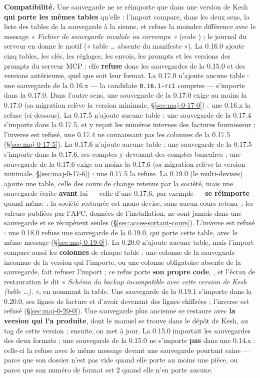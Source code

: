 \documentclass[a4paper,11pt,oneside]{article}
\begin{document}
\textbf{Compatibilité.} Une sauvegarde ne se réimporte que dans une version de Kesh \textbf{qui porte les mêmes tables} qu'elle : l'import compare, dans les deux sens, la liste des tables de la sauvegarde à la sienne, et refuse la moindre différence avec le message \emph{« Fichier de sauvegarde invalide ou corrompu »} (code ) ; le journal du serveur en donne le motif (« table \ldots{} absente du manifeste »). La 0.16.0 ajoute cinq tables, les clés, les réglages, les envois, les prompts et les versions des prompts du serveur MCP : elle \textbf{refuse} donc les sauvegardes de la 0.15.0 et des versions antérieures, quel que soit leur format. La 0.17.0 n'ajoute aucune table : une sauvegarde de la 0.16.x --- la candidate \texttt{0.16.1-rc1} comprise --- s'importe dans la 0.17.0. Dans l'autre sens, une sauvegarde de la 0.17.0 exige au moins la 0.17.0 (sa migration relève la version minimale, \S\ref{sec:maj-0-17-0}) : une 0.16.x la refuse (ci-dessous). La 0.17.5 n'ajoute aucune table : une sauvegarde de la 0.17.4 s'importe dans la 0.17.5, et y reçoit les numéros internes des factures fournisseur ; l'inverse est refusé, une 0.17.4 ne connaissant pas les colonnes de la 0.17.5 (\S\ref{sec:maj-0-17-5}). La 0.17.6 n'ajoute aucune table : une sauvegarde de la 0.17.5 s'importe dans la 0.17.6, ses comptes y devenant des comptes bancaires ; une sauvegarde de la 0.17.6 exige au moins la 0.17.6 (sa migration relève la version minimale, \S\ref{sec:maj-0-17-6}) : une 0.17.5 la refuse. La 0.19.0 (le multi-devises) ajoute une table, celle des cours de change retenus par la société, mais une sauvegarde écrite \textbf{avant} lui --- celle d'une 0.17.6, par exemple --- \textbf{se réimporte} quand même~: la société restaurée est mono-devise, sans aucun cours retenu~; les valeurs publiées par l'AFC, données de l'installation, ne sont jamais dans une sauvegarde et se récupèrent seules (\S\ref{sec:acces-sortant-cours}). L'inverse est refusé : une 0.18.0 refuse une sauvegarde de la 0.19.0, qui porte cette table, avec le même message (\S\ref{sec:maj-0-19-0}). La 0.20.0 n'ajoute aucune table, mais l'import compare aussi les \textbf{colonnes} de chaque table : une colonne de la sauvegarde inconnue de la version qui l'importe, ou une colonne obligatoire absente de la sauvegarde, fait refuser l'import ; ce refus porte \textbf{son propre code}, , et l'écran de restauration le dit « \emph{Schéma du backup incompatible avec cette version de Kesh (table \ldots).} », en nommant la table. Une sauvegarde de la 0.19.1 s'importe dans la 0.20.0, ses lignes de facture et d'avoir devenant des lignes chiffrées ; l'inverse est refusé (\S\ref{sec:maj-0-20-0}). Une sauvegarde plus ancienne se restaure avec \textbf{la version qui l'a produite}, dont le manuel se trouve dans le dépôt de Kesh, au tag de cette version ; ensuite, on met à jour. La 0.15.0 importait les sauvegardes des deux formats ; une sauvegarde de la 0.15.0 ne s'importe \textbf{pas} dans une 0.14.x : celle-ci la refuse avec le même message devant une sauvegarde pourtant saine --- parce que son dossier  n'est pas vide quand elle porte au moins une pièce, ou parce que son numéro de format est 2 quand elle n'en porte aucune.
\end{document}
